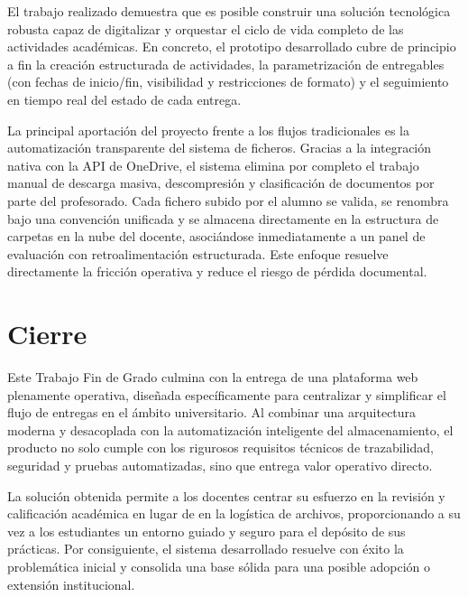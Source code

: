 El trabajo realizado demuestra que es posible construir una soluci\'on tecnol\'ogica robusta capaz de digitalizar y orquestar el ciclo de vida completo de las actividades acad\'emicas. En concreto, el prototipo desarrollado cubre de principio a fin la creaci\'on estructurada de actividades, la parametrizaci\'on de entregables (con fechas de inicio/fin, visibilidad y restricciones de formato) y el seguimiento en tiempo real del estado de cada entrega.

La principal aportaci\'on del proyecto frente a los flujos tradicionales es la automatizaci\'on transparente del sistema de ficheros. Gracias a la integraci\'on nativa con la API de OneDrive, el sistema elimina por completo el trabajo manual de descarga masiva, descompresi\'on y clasificaci\'on de documentos por parte del profesorado. Cada fichero subido por el alumno se valida, se renombra bajo una convenci\'on unificada y se almacena directamente en la estructura de carpetas en la nube del docente, asoci\'andose inmediatamente a un panel de evaluaci\'on con retroalimentaci\'on estructurada. Este enfoque resuelve directamente la fricci\'on operativa y reduce el riesgo de p\'erdida documental.

\FloatBarrier
\section{Cierre}

Este Trabajo Fin de Grado culmina con la entrega de una plataforma web plenamente operativa, dise\~nada espec\'ificamente para centralizar y simplificar el flujo de entregas en el \'ambito universitario. Al combinar una arquitectura moderna y desacoplada con la automatizaci\'on inteligente del almacenamiento, el producto no solo cumple con los rigurosos requisitos t\'ecnicos de trazabilidad, seguridad y pruebas automatizadas, sino que entrega valor operativo directo.

La soluci\'on obtenida permite a los docentes centrar su esfuerzo en la revisi\'on y calificaci\'on acad\'emica en lugar de en la log\'istica de archivos, proporcionando a su vez a los estudiantes un entorno guiado y seguro para el dep\'osito de sus pr\'acticas. Por consiguiente, el sistema desarrollado resuelve con \'exito la problem\'atica inicial y consolida una base s\'olida para una posible adopci\'on o extensi\'on institucional.






